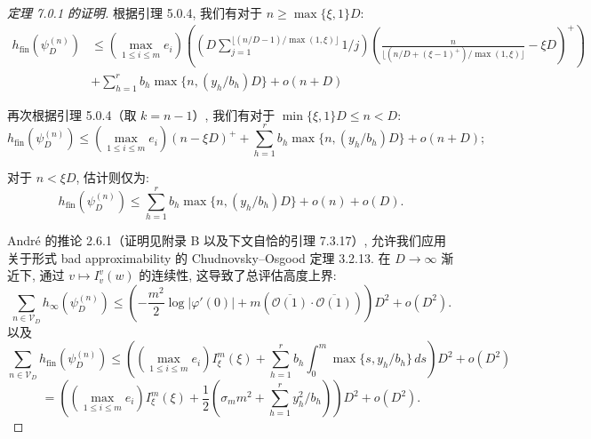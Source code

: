\begin{proof}[定理 7.0.1 的证明]
根据引理 5.0.4, 我们有对于 \(n \geq \max\{\xi, 1\}D\):
\begin{equation}\label{eq:7.3.11}
    \begin{aligned}
        h_{\text{fin}}(\psi_{D}^{(n)}) 
        &\leq \left(\max_{1 \leq i \leq m} e_{i}\right) \left(\left(D \sum_{j=1}^{\lfloor (n/D-1)/\max(1,\xi) \rfloor} 1/j\right) 
        \left(\frac{n}{\lfloor (n/D + (\xi - 1)^{+})/\max(1, \xi) \rfloor} - \xi D\right)^{+}\right) \\
        &+ \sum_{h=1}^{r} b_{h} \max\{n, (y_{h}/b_{h})D\} + o(n+D)
    \end{aligned}
\end{equation}

再次根据引理 5.0.4（取 \(k = n - 1\)）, 我们有对于 \(\min\{\xi, 1\}D \leq n < D\):
\begin{equation}\label{eq:7.3.12}
h_{\text{fin}}(\psi_D^{(n)}) \le \left(\max_{1 \le i \le m} e_i\right) (n - \xi D)^+ + \sum_{h=1}^r b_h \max\{n, (y_h/b_h)D\} + o(n+D);
\end{equation}

对于 \(n < \xi D\), 估计则仅为:
\begin{equation}\label{eq:7.3.13}
h_{\text{fin}}(\psi_D^{(n)}) \le \sum_{h=1}^r b_h \max\{n, (y_h/b_h)D\} + o(n) + o(D).
\end{equation}

Andr{\'e} 的推论 2.6.1（证明见附录 B 以及下文自恰的引理 7.3.17）, 
允许我们应用关于形式 bad approximability 的 Chudnovsky--Osgood 定理 3.2.13. 
在 \(D \to \infty\) 渐近下, 通过 \(v \mapsto I_v^v(w)\) 的连续性, 这导致了总评估高度上界:
\begin{equation}\label{eq:7.3.14}
\sum_{n \in \mathcal{V}_D} h_{\infty}(\psi_D^{(n)}) \le \left( -\frac{m^2}{2} \log |\varphi'(0)| + m(\overline{\mathcal{O}(1)} \cdot \overline{\mathcal{O}(1)}) \right) D^2 + o(D^2).
\end{equation}
以及
\begin{equation}\label{eq:7.3.15}
\sum_{n \in \mathcal{V}_D} h_{\text{fin}}(\psi_D^{(n)}) \le \left( \left( \max_{1 \le i \le m} e_i \right) I_{\xi}^m(\xi) + \sum_{h=1}^r b_h \int_0^m \max\{s, y_h/b_h\} \, ds \right) D^2 + o(D^2) 
\end{equation}
\[ = \left( \left( \max_{1 \le i \le m} e_i \right) I_{\xi}^m(\xi) + \frac{1}{2} \left( \sigma_m m^2 + \sum_{h=1}^r y_h^2/b_h \right) \right) D^2 + o(D^2). \]


\end{proof}
